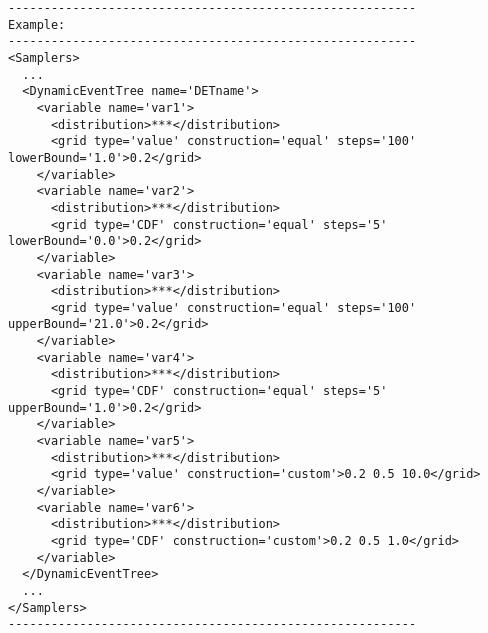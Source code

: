 \begin{lstlisting}[style=XML]
---------------------------------------------------------
Example:
---------------------------------------------------------
<Samplers>
  ...
  <DynamicEventTree name='DETname'> 
    <variable name='var1'> 
      <distribution>***</distribution>
      <grid	type='value' construction='equal' steps='100' lowerBound='1.0'>0.2</grid>	
    </variable> 
    <variable name='var2'> 
      <distribution>***</distribution>
      <grid	type='CDF' construction='equal' steps='5' lowerBound='0.0'>0.2</grid>	
    </variable>
    <variable name='var3'> 
      <distribution>***</distribution>
      <grid	type='value' construction='equal' steps='100' upperBound='21.0'>0.2</grid>	
    </variable> 
    <variable name='var4'> 
      <distribution>***</distribution>
      <grid	type='CDF' construction='equal' steps='5' upperBound='1.0'>0.2</grid>	
    </variable>
    <variable name='var5'> 
      <distribution>***</distribution>
      <grid	type='value' construction='custom'>0.2 0.5 10.0</grid>	
    </variable> 
    <variable name='var6'> 
      <distribution>***</distribution>
      <grid	type='CDF' construction='custom'>0.2 0.5 1.0</grid>	
    </variable>
  </DynamicEventTree>
  ...
</Samplers>
---------------------------------------------------------
\end{lstlisting}

